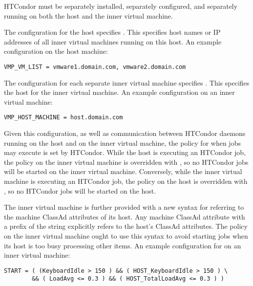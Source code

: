 HTCondor must be separately installed, separately configured,
and separately running on both
the host and the inner virtual machine.

The configuration for the host specifies .
This specifies host names or IP addresses of all inner virtual machines
running on this host.
An example configuration on the host machine:

\footnotesize
\begin{verbatim}
VMP_VM_LIST = vmware1.domain.com, vmware2.domain.com
\end{verbatim}
\normalsize


The configuration for each separate inner virtual machine specifies
.
This specifies the host for the inner virtual machine.
An example configuration on an inner virtual machine:

\footnotesize
\begin{verbatim}
VMP_HOST_MACHINE = host.domain.com
\end{verbatim}
\normalsize

Given this configuration, as well as communication between
HTCondor daemons running on the host and on the inner virtual machine,
the policy for when jobs may execute is set by HTCondor.
While the host is executing an HTCondor job,
the  policy on the inner virtual machine
is overridden with ,
so no HTCondor jobs will be started on the inner virtual machine.
Conversely, while the inner virtual machine is executing an HTCondor job,
the  policy on the host
is overridden with ,
so no HTCondor jobs will be started on the host.

The inner virtual machine is further provided with a new syntax for
referring to the machine ClassAd attributes of its host.
Any machine ClassAd attribute with a prefix of the string
 explicitly refers to the host's ClassAd attributes.
The  policy on the inner virtual machine
ought to use this syntax to avoid starting jobs when its host is
too busy processing other items.
An example configuration for  on an inner virtual machine:

\footnotesize
\begin{verbatim}
START = ( (KeyboardIdle > 150 ) && ( HOST_KeyboardIdle > 150 ) \
        && ( LoadAvg <= 0.3 ) && ( HOST_TotalLoadAvg <= 0.3 ) )
\end{verbatim}
\normalsize

